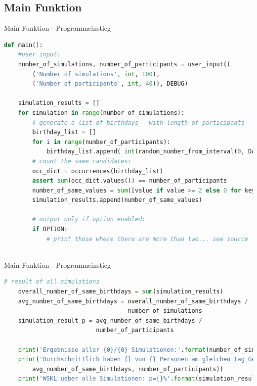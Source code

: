 \subsection{Main Funktion}
\begin{frame}[fragile]{Main Funktion - Programmeinstieg}
  \begin{lstlisting}[language=python]
def main():
    #user input:
    number_of_simulations, number_of_participants = user_input((
        ('Number of simulations', int, 100),
        ('Number of participants', int, 40)), DEBUG)
        
    simulation_results = []
    for simulation in range(number_of_simulations):
        # generate a list of birthdays - with length of participants
        birthday_list = []
        for i in range(number_of_participants):
            birthday_list.append( int(random_number_from_interval(0, DAYS_IN_A_YEAR))+1 )
        # count the same candidates:
        occ_dict = occurrences(birthday_list)
        assert sum(occ_dict.values()) == number_of_participants
        number_of_same_values = sum([value if value >= 2 else 0 for key, value in occ_dict.items()])
        simulation_results.append(number_of_same_values)
        
        # output only if option enabled:
        if OPTION:
        	# print those where there are more than two... see source
    
\end{lstlisting}
\logopythonbottom
\end{frame}

\begin{frame}[fragile]{Main Funktion - Programmeinstieg}
  \begin{lstlisting}[language=python]
    # result of all simulations
    overall_number_of_same_birthdays = sum(simulation_results)
    avg_number_of_same_birthdays = overall_number_of_same_birthdays /
    							   number_of_simulations
    simulation_result_p = avg_number_of_same_birthdays /
    					  number_of_participants
    
    print('Ergebnisse aller {0}/{0} Simulationen:'.format(number_of_simulations))
    print('Durchschnittlich haben {} von {} Personen am gleichen Tag Geburtstag.'.format(
        avg_number_of_same_birthdays, number_of_participants))
    print('WSKL ueber alle Simulationen: p={}%'.format(simulation_result_p * 100))
\end{lstlisting}
\logopythonbottom
\end{frame}

